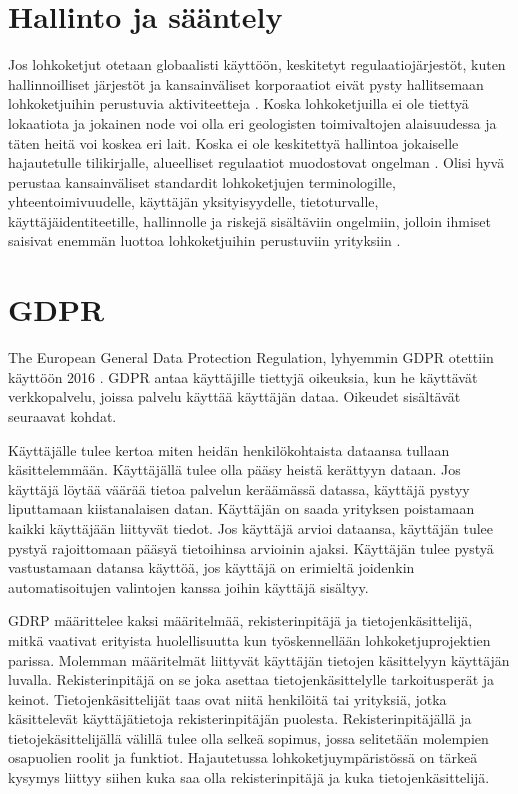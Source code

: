 \documentclass[utf8,bachelor]{gradu3}
\begin{document}
\section{Hallinto ja sääntely}
Jos lohkoketjut otetaan globaalisti käyttöön, keskitetyt regulaatiojärjestöt, kuten hallinnoilliset järjestöt ja kansainväliset korporaatiot eivät pysty hallitsemaan lohkoketjuihin perustuvia aktiviteetteja \parencite{wright2015decentralized}.
Koska lohkoketjuilla ei ole tiettyä lokaatiota ja jokainen node voi olla eri geologisten toimivaltojen alaisuudessa ja täten heitä voi koskea eri lait. 
Koska ei ole keskitettyä hallintoa jokaiselle hajautetulle tilikirjalle, alueelliset regulaatiot muodostovat ongelman \parencite{cermeno2016blockchain}.
Olisi hyvä perustaa kansainväliset standardit lohkoketjujen terminologille, yhteentoimivuudelle, käyttäjän yksityisyydelle, tietoturvalle, käyttäjäidentiteetille, hallinnolle ja riskejä sisältäviin ongelmiin, jolloin ihmiset saisivat enemmän luottoa lohkoketjuihin perustuviin yrityksiin \parencite{ali2019blockchain}.

\section{GDPR}

The European General Data Protection Regulation, lyhyemmin GDPR otettiin käyttöön 2016 \parencite{GDPR}.
GDPR antaa käyttäjille tiettyjä oikeuksia, kun he käyttävät verkkopalvelu, joissa palvelu käyttää käyttäjän dataa. Oikeudet sisältävät seuraavat kohdat.

Käyttäjälle tulee kertoa miten heidän henkilökohtaista dataansa tullaan käsittelemmään.
Käyttäjällä tulee olla pääsy heistä kerättyyn dataan.
Jos käyttäjä löytää väärää tietoa palvelun keräämässä datassa, käyttäjä pystyy liputtamaan kiistanalaisen datan.
Käyttäjän on saada yrityksen poistamaan kaikki käyttäjään liittyvät tiedot.
Jos käyttäjä arvioi dataansa, käyttäjän tulee pystyä rajoittomaan pääsyä tietoihinsa  arvioinin ajaksi.
Käyttäjän tulee pystyä vastustamaan datansa käyttöä, jos käyttäjä on erimieltä joidenkin automatisoitujen valintojen kanssa joihin käyttäjä sisältyy.

GDRP määrittelee kaksi määritelmää, rekisterinpitäjä ja tietojenkäsittelijä, mitkä vaativat erityista huolellisuutta kun työskennellään lohkoketjuprojektien parissa. Molemman määritelmät liittyvät käyttäjän tietojen käsittelyyn käyttäjän luvalla.
Rekisterinpitäjä on se joka asettaa tietojenkäsittelylle tarkoitusperät ja keinot. Tietojenkäsittelijät taas ovat niitä henkilöitä tai yrityksiä, jotka käsittelevät käyttäjätietoja rekisterinpitäjän puolesta. Rekisterinpitäjällä ja tietojekäsittelijällä välillä tulee olla selkeä sopimus, jossa selitetään molempien osa\-puolien roolit ja funktiot.
Hajautetussa lohkoketjuympäristössä on tärkeä kysymys liittyy siihen kuka saa olla rekisterinpitäjä ja kuka tietojenkäsittelijä.
\end{document}
